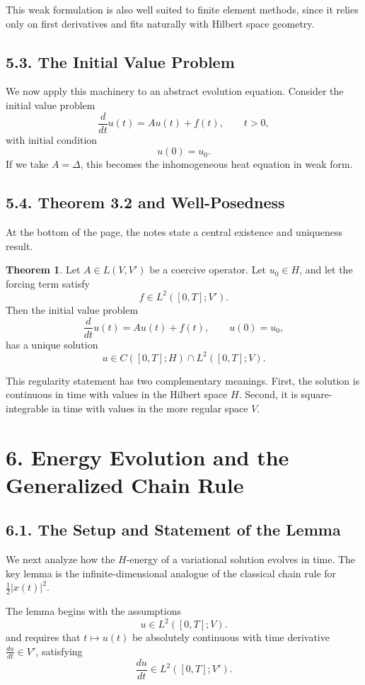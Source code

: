 \documentclass[11pt]{article}
\theoremstyle{definition}
\newtheorem{theorem}{Theorem}
\theoremstyle{remark}
\begin{document}
This weak formulation is also well suited to finite element methods, since it relies only on first derivatives and fits naturally with Hilbert space geometry.

\subsection*{5.3. The Initial Value Problem}
We now apply this machinery to an abstract evolution equation. Consider the initial value problem
\[
\frac{d}{dt}u(t)=Au(t)+f(t),
\qquad t>0,
\]
with initial condition
\[
u(0)=u_0.
\]
If we take \(A=\Delta\), this becomes the inhomogeneous heat equation in weak form.

\subsection*{5.4. Theorem 3.2 and Well-Posedness}
At the bottom of the page, the notes state a central existence and uniqueness result.

\begin{theorem}
Let \(A\in L(V,V')\) be a coercive operator. Let \(u_0\in H\), and let the forcing term satisfy
\[
f\in L^2([0,T];V').
\]
Then the initial value problem
\[
\frac{d}{dt}u(t)=Au(t)+f(t),
\qquad
u(0)=u_0,
\]
has a unique solution
\[
u\in C([0,T];H)\cap L^2([0,T];V).
\]
\end{theorem}

This regularity statement has two complementary meanings. First, the solution is continuous in time with values in the Hilbert space \(H\). Second, it is square-integrable in time with values in the more regular space \(V\).

\section*{6. Energy Evolution and the Generalized Chain Rule}

\subsection*{6.1. The Setup and Statement of the Lemma}
We next analyze how the \(H\)-energy of a variational solution evolves in time. The key lemma is the infinite-dimensional analogue of the classical chain rule for \(\frac12|x(t)|^2\).

The lemma begins with the assumptions
\[
u\in L^2([0,T];V).
\]
and requires that \(t\mapsto u(t)\) be absolutely continuous with time derivative \(\frac{du}{dt}\in V'\), satisfying
\[
\frac{du}{dt}\in L^2([0,T];V').
\]
\end{document}
